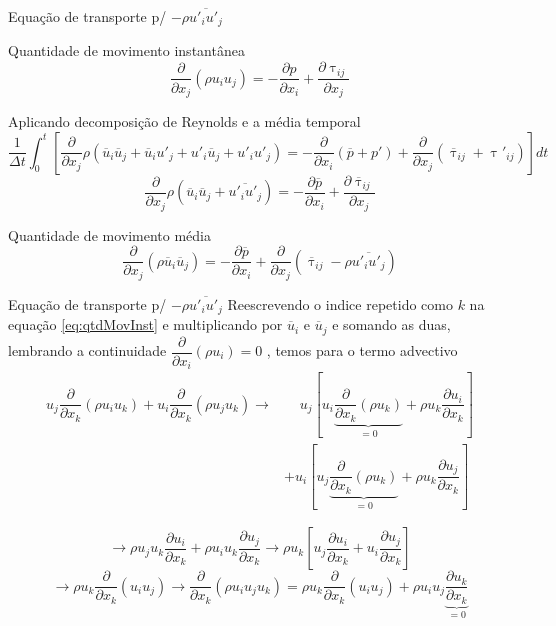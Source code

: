 \documentclass[10pt]{beamer}
\newcommand{\ddx}[2]{\dfrac{\partial #1}{\partial x_{#2}}}
\newcommand{\ddxp}[2]{\dfrac{\partial }{\partial x_{#2}}\left(#1\right)}
\newcommand{\m}[1]{\overline{#1}}
\begin{document}
\begin{frame}{Equação de transporte p/ $ -\rho \m{u'_i u'_j} $}
	\begin{block}{Quantidade de movimento instantânea}
		\begin{equation}\label{eq:qtdMovInst}
		\ddxp{\rho u_i u_j}{j} = - \ddx{p}{i} + \ddx{\uptau_{ij}}{j}
		\end{equation}
	\end{block}

	Aplicando decomposição de Reynolds e a média temporal
	\begin{equation*}
	\dfrac{1}{\Delta t} \int_{0}^{t} \left[ \ddx{ }{j} \rho (\m{u}_i\m{u}_j + \m{u}_i u'_j + u'_i\m{u}_j + u'_i u'_j ) = -\ddxp{\m{p} + p'}{i} + \ddxp{\m{\uptau}_{ij} + \uptau'_{ij}}{j} \right] dt
	\end{equation*}
	\begin{equation*}
	\ddx{ }{j} \rho (\m{u}_i\m{u}_j + \m{u'_i u'_j}) = - \ddx{\m{p}}{i} + \ddx{\m{\uptau}_{ij}}{j}
	\end{equation*}

	\begin{block}{Quantidade de movimento média}
	\begin{equation}\label{eq:qtdMovMean}
	\ddxp{\rho \m{u}_i\m{u}_j}{j} = - \ddx{\m{p}}{i} + \ddxp{\m{\uptau}_{ij} - \rho \m{u'_i u'_j}}{j}
	\end{equation}
	\end{block}
	
\end{frame}


\begin{frame}{Equação de transporte p/ $ -\rho \m{u'_i u'_j} $}
	Reescrevendo o indice repetido como $k$ na equação \ref{eq:qtdMovInst} e multiplicando por $ \m{u}_i $ e $ \m{u}_j $ e somando as duas, lembrando a continuidade $ \ddxp{\rho u_i}{i} = 0 $ , temos para o termo advectivo
	\begin{align*}
	u_j \ddxp{\rho u_i u_k}{k} + u_i \ddxp{\rho u_j u_k}{k} \rightarrow 
	&\;\;\;\; u_j \left[ u_i \underbrace{\ddxp{\rho u_k}{k}}_{=0} + \rho u_k\ddx{u_i}{k}\right] \\
	&+ u_i \left[ u_j \underbrace{\ddxp{\rho u_k}{k}}_{=0} + \rho u_k\ddx{u_j}{k}\right]
	\end{align*}
	
	\begin{equation*}
	\rightarrow \rho u_j u_k \ddx{u_i}{k} + \rho u_i u_k \ddx{u_j}{k} \rightarrow \rho u_k \left[ u_j \ddx{u_i}{k} + u_i \ddx{u_j}{k} \right]
	\end{equation*}
	\begin{equation*}
	\rightarrow \rho u_k \ddxp{u_i u_j}{k} \rightarrow \boxed{\ddxp{\rho u_i u_j u_k}{k}}
	= \rho u_k \ddxp{u_i u_j}{k} + \rho u_i u_j \underbrace{\ddx{u_k}{k}}_{=0}
	\end{equation*}
\end{frame}
\end{document}
